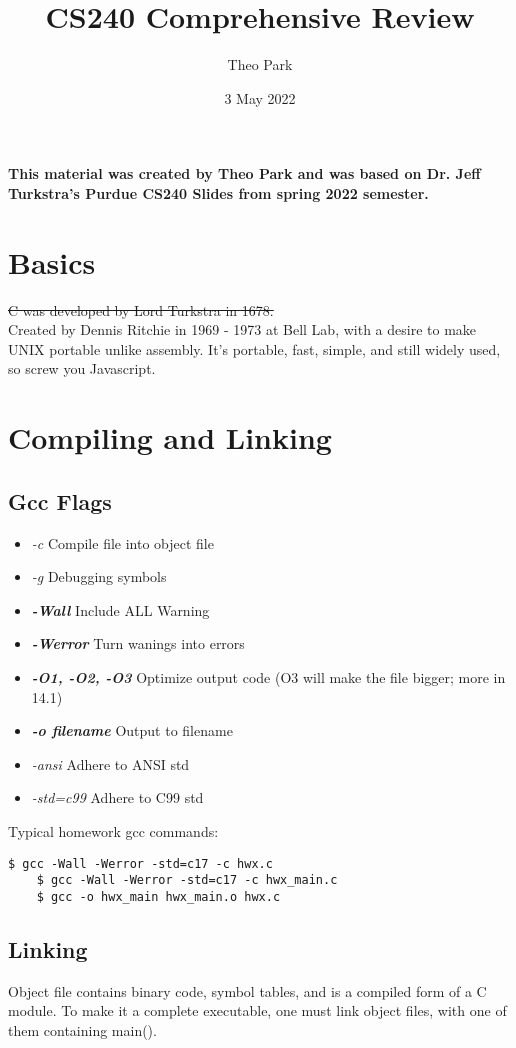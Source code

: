 \documentclass{article}
\title{CS240 Comprehensive Review}
\author{Theo Park}
\date{3 May 2022}
\begin{document}
\maketitle

\pagestyle{fancy}

\textbf{This material was created by Theo Park and was based on Dr. Jeff Turkstra's Purdue CS240 Slides from spring 2022 semester.}

\section{Basics}
\st{C was developed by Lord Turkstra in 1678.}\\
Created by Dennis Ritchie in 1969 - 1973 at Bell Lab, with a desire to make UNIX portable unlike assembly.
It's portable, fast, simple, and still widely used, so screw you Javascript.


\section{Compiling and Linking}

\subsection{Gcc Flags}
\begin{itemize}
    \item \textit{-c} Compile file into object file
    \item \textit{-g} Debugging symbols
    \item \textbf{\textit{-Wall}} Include ALL Warning
    \item \textbf{\textit{-Werror}} Turn wanings into errors
    \item \textbf{\textit{-O1, -O2, -O3}} Optimize output code (O3 will make the file bigger; more in 14.1)
    \item \textbf{\textit{-o filename}} Output to filename
    \item \textit{-ansi} Adhere to ANSI std
    \item \textit{-std=c99} Adhere to C99 std
\end{itemize}
Typical homework gcc commands:
\begin{lstlisting}[style=BashStyle]
    $ gcc -Wall -Werror -std=c17 -c hwx.c
    $ gcc -Wall -Werror -std=c17 -c hwx_main.c
    $ gcc -o hwx_main hwx_main.o hwx.c
\end{lstlisting}

\subsection{Linking}
Object file contains binary code, symbol tables, and is a compiled form of a C module.
To make it a complete executable, one must link object files, with one of them containing main().
\end{document}
